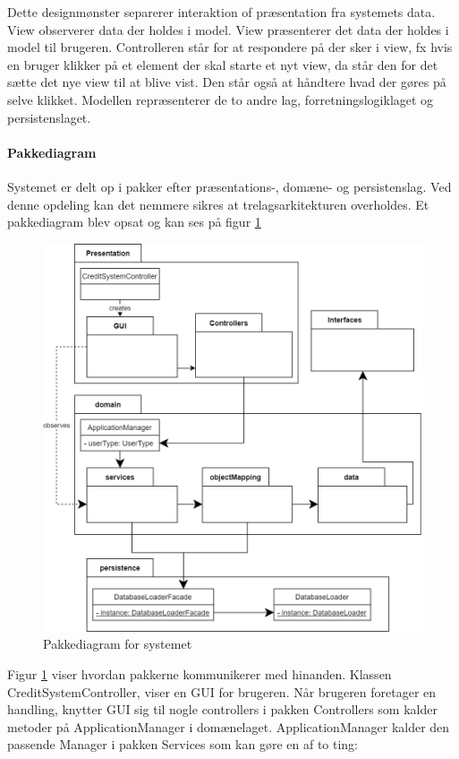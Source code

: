 Dette designmønster separerer interaktion of præsentation fra systemets data.
View observerer data der holdes i model. View præsenterer det data der holdes i
model til brugeren. Controlleren står for at respondere på der sker i view, fx
hvis en bruger klikker på et element der skal starte et nyt view, da står den
for det sætte det nye view til at blive vist. Den står også at håndtere hvad der
gøres på selve klikket. 
Modellen repræsenterer de to andre lag, forretningslogiklaget og persistenslaget.
\paragraph{Pakkediagram} Systemet er delt op i pakker efter præsentations-,
domæne- og persistenslag. Ved denne opdeling kan det nemmere sikres at
trelagsarkitekturen overholdes. Et pakkediagram blev opsat og kan ses på figur
\ref{fig:PackageDiagram}

\begin{figure}[H]
    \centering
\includegraphics[scale = 0.3]{images/PackageDiagram.png}
    \caption{Pakkediagram for systemet}
    \label{fig:PackageDiagram}
\end{figure}

Figur \ref{fig:PackageDiagram} viser hvordan pakkerne kommunikerer med hinanden.
Klassen CreditSystemController, viser en GUI for brugeren. Når brugeren
foretager en handling, knytter GUI sig til nogle controllers i pakken
Controllers som kalder metoder på ApplicationManager i domænelaget.
ApplicationManager kalder den passende Manager i pakken Services som kan gøre en
af to ting: 

